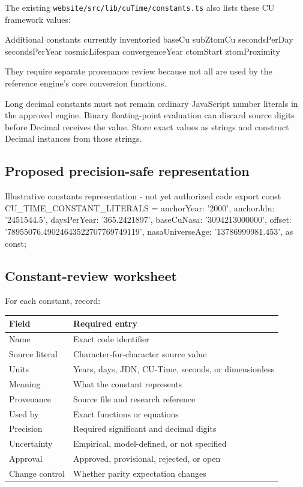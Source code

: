 \documentclass[11pt,letterpaper]{article}
\begin{document}
The existing \nolinkurl{website/src/lib/cuTime/constants.ts} also lists these
CU framework values:

\begin{codebox}{Additional constants currently inventoried}
baseCu
subZtomCu
secondsPerDay
secondsPerYear
cosmicLifespan
convergenceYear
ctomStart
ztomProximity
\end{codebox}

They require separate provenance review because not all are used by the
reference engine's core conversion functions.

\begin{warningbox}
Long decimal constants must not remain ordinary JavaScript number literals in
the approved engine. Binary floating-point evaluation can discard source
digits before Decimal receives the value. Store exact values as strings and
construct Decimal instances from those strings.
\end{warningbox}

\subsection{Proposed precision-safe representation}

\begin{codebox}{Illustrative constants representation - not yet authorized code}
export const CU_TIME_CONSTANT_LITERALS = {
  anchorYear: '2000',
  anchorJdn: '2451544.5',
  daysPerYear: '365.2421897',
  baseCuNasa: '3094213000000',
  offset: '78955076.49024643522707769749119',
  nasaUniverseAge: '13786999981.453',
} as const;
\end{codebox}

\subsection{Constant-review worksheet}

For each constant, record:

\begin{longtable}{L{1.5in}L{4.85in}}
\toprule
\textbf{Field} & \textbf{Required entry} \\
\midrule
Name & Exact code identifier \\
Source literal & Character-for-character source value \\
Units & Years, days, JDN, CU-Time, seconds, or dimensionless \\
Meaning & What the constant represents \\
Provenance & Source file and research reference \\
Used by & Exact functions or equations \\
Precision & Required significant and decimal digits \\
Uncertainty & Empirical, model-defined, or not specified \\
Approval & Approved, provisional, rejected, or open \\
Change control & Whether parity expectation changes \\
\bottomrule
\end{longtable}
\end{document}
